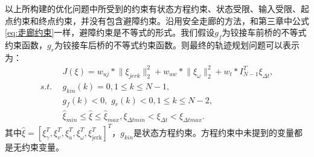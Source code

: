 \documentclass[master,academic]{ysuthesis} %
\begin{document}
		以上所构建的优化问题中所受到的约束有状态方程约束、状态受限、输入受限、起点约束和终点约束，并没有包含避障约束。沿用安全走廊的方法，和第三章中公式\ref{eq:走廊约束}一样，避障约束是不等式的形式。我们假设$g_f$为铰接车前桥的不等式约束函数，$g_r$为铰接车后桥的不等式约束函数。则最终的轨迹规划问题可以表示为：
		\begin{equation}
			\begin{aligned}
			&J\left( \xi \right) =w_{uj}*\lVert \xi _{jerk} \rVert _{2}^{2}+w_{uw}*\lVert \xi _{\omega} \rVert _{2}^{2}+w_t*I_{N-1}^{T}\xi _{\Delta t},\\
			s.t.\ \ &g_{kin}\left( k \right) =0,1\leq k\leq N-1,\\
			&g_f\left( k \right) <0,\,\,g_r\left( k \right) <0,1\leq k\leq N-2,\\
			&\hat{\xi}_{min}\le \hat{\xi}\le \hat{\xi}_{max},\xi _{\Delta tmin}<\xi _{\Delta t}<\xi _{\Delta tmax}.
			\end{aligned}   
		\end{equation}
		其中$\hat{\xi}=\left[ \xi _{\gamma}^{T},\xi _{v}^{T},\xi _{a}^{T},\xi _{\omega}^{T},\xi _{\text{jerk}}^{T} \right] ^T$，$g_{kin}$是状态方程约束。方程约束中未提到的变量都是无约束变量。
\end{document}
